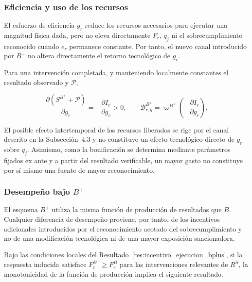 \subsubsection{Eficiencia y uso de los recursos}

El esfuerzo de eficiencia \(g_r\) reduce los recursos necesarios para ejecutar una magnitud física dada, pero no eleva directamente \(F_r\), \(q_j\) ni el sobrecumplimiento reconocido cuando \(e_r\) permanece constante. Por tanto, el nuevo canal introducido por \(B^{+}\) no altera directamente el retorno tecnológico de \(g_r\).

Para una intervención completada, y manteniendo localmente constantes el resultado observado y \(\mathcal P\),

\begin{equation}
\label{eq:incentivo_eficiencia_bplus}
\frac{\partial (S^{B^{+}}+\mathcal P)}{\partial g_r}
=
-
\frac{\partial I_r}{\partial g_r}
>0,
\qquad
\mathcal B_{r,g}^{B^{+}}
=
\varpi^{B^{+}}
\left(
-
\frac{\partial I_r}{\partial g_r}
\right).
\end{equation}

El posible efecto intertemporal de los recursos liberados se rige por el canal descrito en la Subsección~4.3 y no constituye un efecto tecnológico directo de \(g_r\) sobre \(q_j\). Asimismo, como la bonificación se determina mediante parámetros fijados ex ante y a partir del resultado verificable, un mayor gasto no constituye por sí mismo una fuente de mayor reconocimiento.

\subsubsection{Desempeño bajo \(B^{+}\)}

El esquema \(B^{+}\) utiliza la misma función de producción de resultados que \(B\). Cualquier diferencia de desempeño proviene, por tanto, de los incentivos adicionales introducidos por el reconocimiento acotado del sobrecumplimiento y no de una modificación tecnológica ni de una mayor exposición sancionadora.

Bajo las condiciones locales del Resultado~\ref{res:incentivo_ejecucion_bplus}, si la respuesta inducida satisface \(F_r^{B^{+}}\geq F_r^{B}\) para las intervenciones relevantes de \(R^{S}\), la monotonicidad de la función de producción implica el siguiente resultado.

